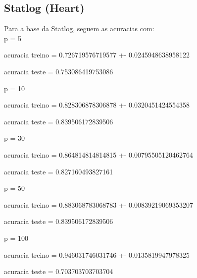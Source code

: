 \documentclass{article}
\begin{document}
\subsection{Statlog (Heart)}




Para a base da Statlog, seguem as acuracias com:
\\p = 5 

\begin{Schunk}
\begin{Soutput}
acuracia treino = 0.726719576719577 +- 0.0245948638958122
\end{Soutput}
\begin{Soutput}
acuracia teste = 0.753086419753086
\end{Soutput}
\end{Schunk}

p = 10 


\begin{Schunk}
\begin{Soutput}
acuracia treino = 0.828306878306878 +- 0.0320451424554358
\end{Soutput}
\begin{Soutput}
acuracia teste = 0.839506172839506
\end{Soutput}
\end{Schunk}

p = 30 


\begin{Schunk}
\begin{Soutput}
acuracia treino = 0.864814814814815 +- 0.00795505120462764
\end{Soutput}
\begin{Soutput}
acuracia teste = 0.827160493827161
\end{Soutput}
\end{Schunk}

p = 50 


\begin{Schunk}
\begin{Soutput}
acuracia treino = 0.883068783068783 +- 0.00839219069353207
\end{Soutput}
\begin{Soutput}
acuracia teste = 0.839506172839506
\end{Soutput}
\end{Schunk}

p = 100 


\begin{Schunk}
\begin{Soutput}
acuracia treino = 0.946031746031746 +- 0.0135819947978325
\end{Soutput}
\begin{Soutput}
acuracia teste = 0.703703703703704
\end{Soutput}
\end{Schunk}
\end{document}
